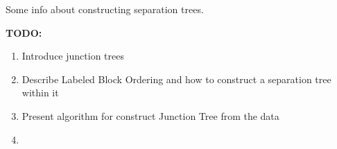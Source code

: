 %
%


Some info about constructing separation trees.

\textbf{TODO:}
\begin{enumerate}
	\item Introduce junction trees
	\item Describe Labeled Block Ordering and how to construct a separation tree within it
	\item Present algorithm for construct Junction Tree from the data
	\item 
\end{enumerate}







